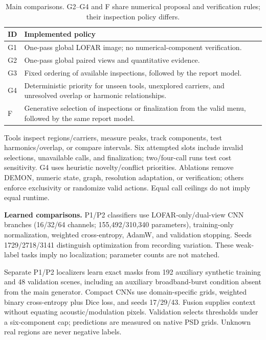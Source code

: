 \documentclass[runningheads,orivec]{llncs}
\begin{document}
\begin{table}[tb]
\caption{Main comparisons. G2--G4 and F share numerical proposal and verification rules; their inspection policy differs.}
\label{tab:methods}\centering\small
\begin{tabular}{@{}lp{9.1cm}@{}}\toprule
ID & Implemented policy \\\midrule
G1 & One-pass global LOFAR image; no numerical-component verification. \\
G2 & One-pass global paired views and quantitative evidence. \\
G3 & Fixed ordering of available inspections, followed by the report model. \\
G4 & Deterministic priority for unseen tools, unexplored carriers, and unresolved overlap or harmonic relationships. \\
F & Generative selection of inspections or finalization from the valid menu, followed by the same report model. \\\bottomrule
\end{tabular}
\end{table}

Tools inspect regions/carriers, measure peaks, track components, test harmonics/overlap, or compare intervals. Six attempted slots include invalid selections, unavailable calls, and finalization; two/four-call runs test cost sensitivity. G4 uses heuristic novelty/conflict priorities. Ablations remove DEMON, numeric state, graph, resolution adaptation, or verification; others enforce exclusivity or randomize valid actions. Equal call ceilings do not imply equal runtime.

\textbf{Learned comparisons.} P1/P2 classifiers use LOFAR-only/dual-view CNN branches (16/32/64 channels; 155,492/310,340 parameters), training-only normalization, weighted cross-entropy, AdamW, and validation stopping. Seeds 1729/2718/3141 distinguish optimization from recording variation. These weak-label tasks imply no localization; parameter counts are not matched.

Separate P1/P2 localizers learn exact masks from 192 auxiliary synthetic training and 48 validation scenes, including an auxiliary broadband-burst condition absent from the main generator. Compact CNNs use domain-specific grids, weighted binary cross-entropy plus Dice loss, and seeds 17/29/43. Fusion supplies context without equating acoustic/modulation pixels. Validation selects thresholds under a six-component cap; predictions are measured on native PSD grids. Unknown real regions are never negative labels.
\end{document}

